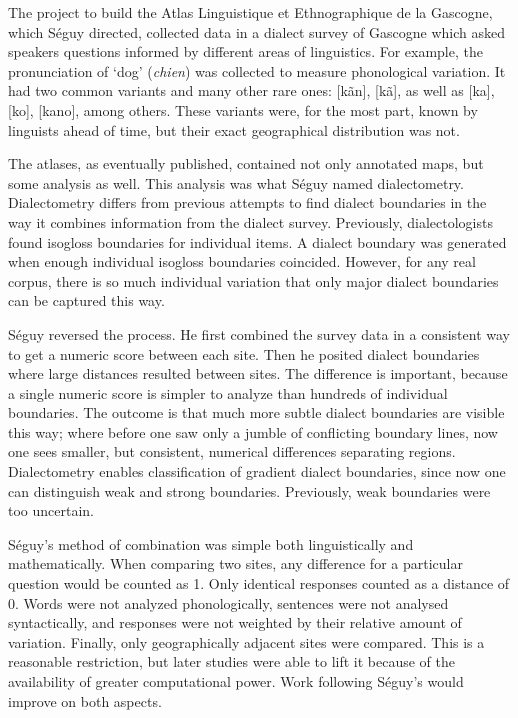 \documentclass[11pt]{article}
\begin{document}
The project to build the Atlas Linguistique et Ethnographique de la
Gascogne, which S\'eguy directed, collected data in a dialect survey
of Gascogne which asked speakers questions informed by different areas
of linguistics. For example, the pronunciation of `dog' ({\it chien})
was collected to measure phonological variation. It had two common
variants and many other rare ones: [k\~an], [k\~a], as well as [ka],
[ko], [kano], among others. These variants were, for the most part,
known by linguists ahead of time, but their exact geographical
distribution was not.

The atlases, as eventually published, contained not only annotated
maps, but some analysis as well. This analysis was what S\'eguy named
dialectometry. Dialectometry differs from previous attempts to find
dialect boundaries in the way it combines information from the
dialect survey. Previously, dialectologists found isogloss
boundaries for individual items. A dialect boundary was generated when
enough individual isogloss boundaries coincided. However, for any real
corpus, there is so
much individual variation that only major dialect boundaries can
be captured this way.

S\'eguy reversed the process. He first combined the survey data in a
consistent way to get
a numeric score between each site. Then he posited dialect boundaries
where large distances resulted between sites. The difference is
important, because a single numeric score is simpler to
analyze than hundreds of individual boundaries. The outcome is that
much more subtle dialect boundaries are visible this way; where before
one saw only a jumble of conflicting boundary lines, now one sees
smaller, but consistent, numerical differences separating regions. {Dialectometry
  enables classification of gradient dialect boundaries, since now one
can distinguish weak and strong boundaries. Previously, weak
boundaries were too uncertain.}

S\'eguy's method of combination was simple both
linguistically and mathematically. When comparing two sites, any
difference for a particular question would be counted as 1. Only identical
responses counted as a distance of 0. Words were not analyzed
phonologically, sentences were not analysed syntactically, and
responses were not weighted by their relative amount
of variation. Finally, only geographically adjacent sites were
compared. This is a reasonable restriction, but later studies were
able to lift it because of the availability of greater computational
power. Work following S\'eguy's would improve on both aspects.
\end{document}
